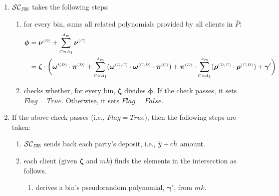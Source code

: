 \begin{enumerate}
 \item\label{compute-res-poly}  $\mathcal{SC}_{\mathtt{JUS}}$ takes the following steps:
 \begin{enumerate}
 \item for every bin, sums all related polynomials  provided by all clients in $\bar{P}$:
 \begin{equation*}
\begin{split}
 \bm\phi&= \bm\nu^{\scriptscriptstyle  {  {(D)}} }+\sum\limits^{\scriptscriptstyle  {   A}_{\scriptscriptstyle  {   m}}}_{\scriptscriptstyle   {  {C }= }   {   A}_{\scriptscriptstyle  {  1}}}\bm\nu^{\scriptscriptstyle  {  {(C)}} }\\
 &= \bm\zeta\cdot \bigg(\bm\omega'^{\scriptscriptstyle  {  {(D)}}}\cdot \bm\pi^{\scriptscriptstyle  {  {(D)}} } +\sum\limits^{\scriptscriptstyle  {   A}_{  {   m}}}_{\scriptscriptstyle  {  {C }= }   {   A}_{\scriptscriptstyle  {  1}}}(\bm\omega^{\scriptscriptstyle  {  {(D,C)}}} \cdot \bm\omega^{\scriptscriptstyle  {  {(C,D)}}}\cdot \bm\pi^{\scriptscriptstyle  {  (C)}}) +\bm\pi^{\scriptscriptstyle  {  {(D)}}}\cdot\sum\limits^{\scriptscriptstyle  {   A}_{ \scriptscriptstyle {   m}}}_{\scriptscriptstyle  {C= }   {   A}_{\scriptscriptstyle  {  1}}}(\bm\rho^{\scriptscriptstyle  {  {(D,C)}}} \cdot \bm\rho^{\scriptscriptstyle  {  {(C,D)}}}) + \bm\gamma'\bigg)
  \end{split}
\end{equation*}
 
  \item\label{F-PSI:detect-misbehaving-party} checks whether, for every bin, $\bm\zeta$ divides $\bm\phi$. If the check passes, it sets $Flag=True$. Otherwise, it sets $Flag=False$. 
  
 
 
 \end{enumerate}
 
\item\label{F-PSI::flag-is-true} If the above check passes (i.e., $Flag=True$), then the following steps are taken:

\begin{enumerate}
 \item $\mathcal{SC}_{\mathtt{JUS}}$ sends back each party's deposit, i.e., $\ddot{y}+\ddot{ch}$ amount.
 
  \item each client (given $\bm\zeta$ and $mk$) finds the elements in the intersection as follows. 
  \begin{enumerate}
  \item derives a bin's pseudorandom polynomial, $\bm\gamma'$, from $mk$. 
  

\end{enumerate}
\end{enumerate}
\end{enumerate}
